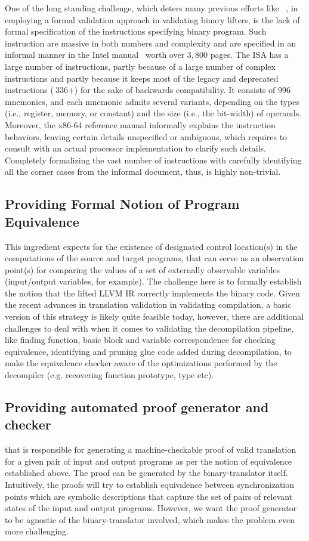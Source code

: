 One of the long standing challenge, which deters many previous efforts like
~\cite{ASE2017}, in employing a formal validation approach in validating
binary lifters, is the lack of formal specification of the \ISA instructions
specifying binary program. Such instruction are massive in both numbers and
complexity and are specified in an informal manner in the Intel
manual~\cite{IntelManual} worth over $3,800$ pages. The \ISA ISA has a large
number of instructions, partly because of a large number of complex
instructions and partly because it keeps most of the legacy and deprecated
instructions ($~336$+) for the sake of backwards compatibility. It consists of
$996$ mnemonics, and each mnemonic admits several variants, depending on the
types (i.e., register, memory, or constant) and the size (i.e., the bit-width)
  of operands. Moreover, the x86-64 reference manual informally explains the
  instruction behaviors, leaving certain details unspecified or ambiguous,
  which requires  to consult with an actual processor implementation to clarify
  such details. Completely formalizing the vast number of instructions with
  carefully identifying all the corner cases from the informal document, thus,
  is highly non-trivial.

\subsection{Providing Formal Notion of Program Equivalence} This ingredient
expects for the existence of designated control location(s) in the computations
of the source and target programs, that can serve as an observation point(s)
  for comparing the values of a set of externally observable variables
  (input/output variables, for example). The challenge here is to formally
  establish the notion that the lifted LLVM IR  correctly implements the \ISA
  binary code. Given the recent advances in translation validation in
  validating compilation, a basic version of this strategy is likely quite
  feasible today, however, there are additional challenges to deal with when it
  comes to validating the decompilation pipeline, like finding function, basic
  block and variable correspondence for checking equivalence, identifying and
  pruning glue code added during decompilation, to make the equivalence checker
  aware of the optimizations performed by the decompiler (e.g.  recovering
      function prototype, type etc).

\subsection{Providing automated proof generator and checker} that is responsible
for generating a machine-checkable proof  of valid translation for a given pair
of input and output programs as per the notion of equivalence established
above. The proof can be generated by  the binary-translator itself.
Intuitively, the proofs will try to establish equivalence between
synchronization points which are symbolic descriptions that capture the set of
pairs of relevant states of the input and output programs. However, we want 
the proof generator to be agnostic of the binary-translator involved, which 
makes the problem  even more challenging.   


